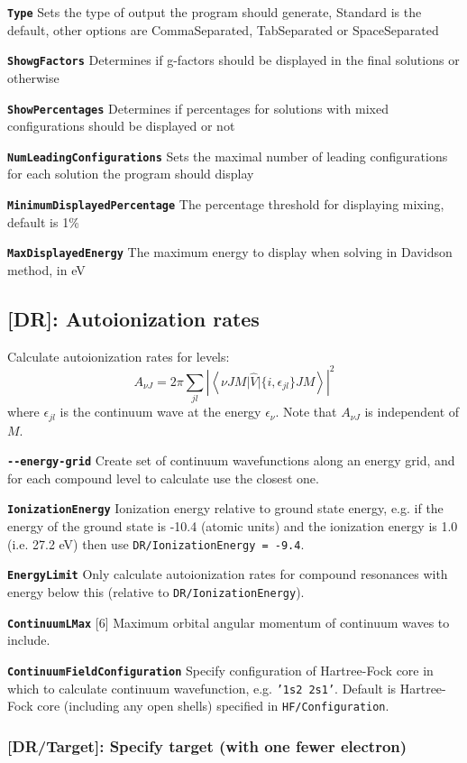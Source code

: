 \documentclass[a4paper,11pt]{article}
\newcommand{\option}[1]{\smallskip\noindent\textbf{\texttt{#1}}}
\newcommand{\code}[1]{\texttt{#1}}
\begin{document}
\option{Type} Sets the type of output the program should generate, Standard is the default, other options are CommaSeparated, TabSeparated or SpaceSeparated

\option{ShowgFactors} Determines if g-factors should be displayed in the final solutions or otherwise

\option{ShowPercentages} Determines if percentages for solutions with mixed configurations should be displayed or not

\option{NumLeadingConfigurations} Sets the maximal number of leading configurations for each solution the program should display

\option{MinimumDisplayedPercentage} The percentage threshold for displaying mixing, default is 1\%

\option{MaxDisplayedEnergy} The maximum energy to display when solving in Davidson method, in eV

\subsection{[DR]: Autoionization rates}

Calculate autoionization rates for levels:
\[
A_{\nu J} = 2\pi \sum_{j l} \left| \left< \nu JM \Big| \hat V \Big| \{i, \epsilon_{j l} \} JM \right> \right|^2
\]
where $\epsilon_{j l}$ is the continuum wave at the energy $\epsilon_\nu$. Note that $A_{\nu J}$ is independent of $M$.

\option{-{}-energy-grid} Create set of continuum wavefunctions along an energy grid, and for each compound level to calculate use the closest one.

\option{IonizationEnergy} Ionization energy relative to ground state energy, e.g. if the energy of the ground state is -10.4 (atomic units) and the ionization energy is  1.0 (i.e. 27.2 eV) then use \code{DR/IonizationEnergy = -9.4}.

\option{EnergyLimit} Only calculate autoionization rates for compound resonances with energy below this (relative to \code{DR/IonizationEnergy}).

\option{ContinuumLMax} [6] Maximum orbital angular momentum of continuum waves to include.

\option{ContinuumFieldConfiguration} Specify configuration of Hartree-Fock core in which to calculate continuum wavefunction, e.g. \code{'1s2 2s1'}. Default is Hartree-Fock core (including any open shells) specified in \code{HF/Configuration}.

\subsubsection{[DR/Target]: Specify target (with one fewer electron)}
\end{document}
